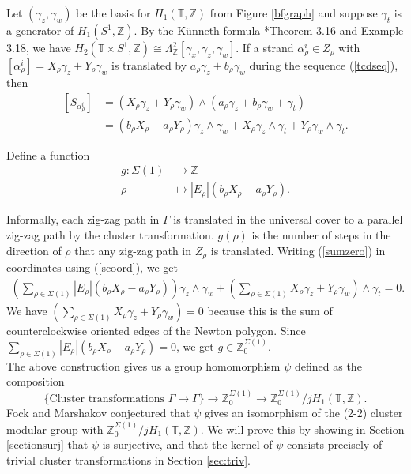 \documentclass[11pt]{article} %
\theoremstyle{definition}
\newcommand{\Z}{{\mathbb Z}}
\newcommand{\T}{{\mathbb T}}
\newcommand{\ra}{\rightarrow}
\newcommand{\be}{\begin{equation}}
\newcommand{\ee}{\end{equation}}
\newcommand{\la}{\label}
\begin{document}
Let $(\gamma_z,\gamma_w)$ be the  basis for $H_1(\mathbb T,\Z)$ from Figure \ref{bfgraph} and suppose $\gamma_t$ is a generator of $H_1(S^1,\Z)$. By the K\"unneth formula \cite{Hatcher}*{Theorem 3.16 and Example 3.18}, we have $H_2(\T \times S^1,\Z) \cong \Lambda^2 _\Z[\gamma_x,\gamma_z,\gamma_w]$.
If a strand $\alpha^i_\rho \in Z_\rho$ with $[\alpha_\rho^i]=X_\rho \gamma_z+Y_\rho \gamma_w$ is translated by $a_\rho \gamma_z + b_\rho \gamma_w$ during the sequence (\ref{tcdseq}), then
\begin{align}\la{scoord}
[S_{\alpha_\rho^i}]&= (X_\rho \gamma_z + Y_\rho \gamma_w) \wedge (a_\rho \gamma_z + b_\rho \gamma_w + \gamma_t) \nonumber \\
&=(b_\rho X_\rho- a_\rho Y_\rho)\gamma_z \wedge \gamma_w + X_\rho \gamma_z \wedge \gamma_t + Y_\rho \gamma_w \wedge \gamma_t.
\end{align}

Define a function
\begin{align*}
g:\Sigma(1) &\ra \Z\\
\rho &\mapsto |E_\rho| (b_\rho X_\rho-a_\rho Y_\rho).
\end{align*}

 Informally, each zig-zag path in $\Gamma$ is translated in the universal cover to a parallel zig-zag path by the cluster transformation. $g(\rho)$ is the number of steps in the direction of $\rho$ that any zig-zag path in $Z_\rho$ is translated. Writing (\ref{sumzero}) in coordinates using (\ref{scoord}), we get
 \begin{align*}
     \left(\sum_{\rho \in \Sigma(1)} |E_\rho|(b_\rho X_\rho-a_\rho Y_\rho)\right)\gamma_z \wedge \gamma_w +\left(\sum_{\rho \in \Sigma(1)} X_\rho \gamma_z + Y_\rho \gamma_w \right)\wedge \gamma_t=0.
 \end{align*}
 We have $\left(\sum_{\rho \in \Sigma(1)} X_\rho \gamma_z + Y_\rho \gamma_w \right)=0$ because this is the sum of counterclockwise oriented edges of the Newton polygon. Since $\sum_{\rho \in \Sigma(1)} |E_\rho|(b_\rho X_\rho-a_\rho Y_\rho)=0$, we get  
  $g \in \mathbb Z^{\Sigma(1)}_0$. \\

The above construction gives us a group homomorphism $\psi$ defined as the composition
\be \label{psi}
\{\text{Cluster transformations } \Gamma \ra \Gamma\} \ra \Z^{\Sigma(1)}_0 \ra \mathbb Z^{\Sigma(1)}_0/j H_1(\T,\Z).
\ee
Fock and Marshakov \cite{FM16} conjectured that $\psi$ gives an isomorphism of the (2-2) cluster modular group with $\mathbb Z^{\Sigma(1)}_0/j H_1(\T,\Z).$ We will prove this by showing in Section \ref{sectionsurj} that $\psi$ is surjective, and that the kernel of $\psi$ consists precisely of trivial cluster transformations in Section \ref{sec:triv}.
\end{document}
